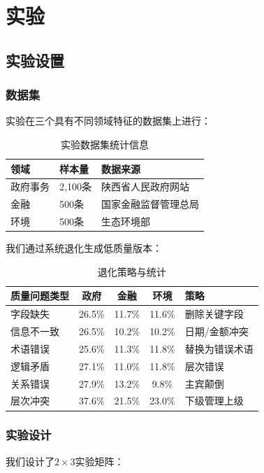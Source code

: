 \documentclass[runningheads]{llncs}
\begin{document}
\section{实验}

\subsection{实验设置}

\subsubsection{数据集}
实验在三个具有不同领域特征的数据集上进行：

\begin{table}[H]
    \centering
    \caption{实验数据集统计信息}
    \label{tab:dataset_stats}
    \begin{tabularx}{\textwidth}{l l X}
    \toprule
    领域 & 样本量 & 数据来源 \\
    \midrule
    政府事务 & 2,100条 & 陕西省人民政府网站 \\
    金融 & 500条 & 国家金融监督管理总局 \\
    环境 & 500条 & 生态环境部 \\
    \bottomrule
    \end{tabularx}
\end{table}

我们通过系统退化生成低质量版本：

\begin{table}[H]
    \centering
    \caption{退化策略与统计}
    \label{tab:degradation_stats}
    \begin{tabularx}{\textwidth}{l c c c X}
    \toprule
    质量问题类型 & 政府 & 金融 & 环境 & 策略 \\
    \midrule
    字段缺失 & 26.5\% & 11.7\% & 11.6\% & 删除关键字段 \\
    信息不一致 & 26.5\% & 10.2\% & 10.2\% & 日期/金额冲突 \\
    术语错误 & 25.6\% & 11.3\% & 11.8\% & 替换为错误术语 \\
    逻辑矛盾 & 27.1\% & 11.0\% & 11.8\% & 层次错误 \\
    关系错误 & 27.9\% & 13.2\% & 9.8\% & 主宾颠倒 \\
    层次冲突 & 37.6\% & 21.5\% & 23.0\% & 下级管理上级 \\
    \bottomrule
    \end{tabularx}
\end{table}

\subsubsection{实验设计}
我们设计了$2\times3$实验矩阵：
\end{document}
